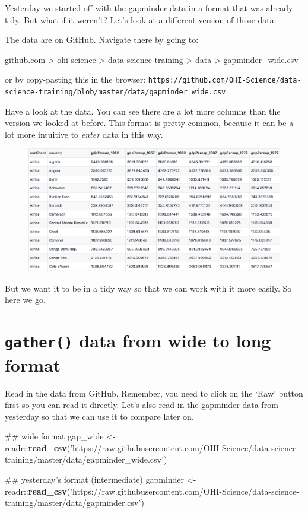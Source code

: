 \documentclass[]{book}
\newenvironment{Shaded}{\begin{snugshade}}{\end{snugshade}}
\newcommand{\KeywordTok}[1]{\textcolor[rgb]{0.13,0.29,0.53}{\textbf{{#1}}}}
\newcommand{\StringTok}[1]{\textcolor[rgb]{0.31,0.60,0.02}{{#1}}}
\newcommand{\NormalTok}[1]{{#1}}
\theoremstyle{definition}
\theoremstyle{definition}
\theoremstyle{definition}
\theoremstyle{remark}
\begin{document}
Yesterday we started off with the gapminder data in a format that was
already tidy. But what if it weren't? Let's look at a different version
of those data.

The data are on GitHub. Navigate there by going to:

github.com \textgreater{} ohi-science \textgreater{}
data-science-training \textgreater{} data \textgreater{}
gapminder\_wide.csv

or by copy-pasting this in the browser:
\texttt{https://github.com/OHI-Science/data-science-training/blob/master/data/gapminder\_wide.csv}

Have a look at the data. You can see there are a lot more columns than
the version we looked at before. This format is pretty common, because
it can be a lot more intuitive to \emph{enter} data in this way.

\begin{figure}[htbp]
\centering
\includegraphics{img/gapminder_wide_gh.png}
\caption{}
\end{figure}

But we want it to be in a tidy way so that we can work with it more
easily. So here we go.

\section{\texorpdfstring{\texttt{gather()} data from wide to long
format}{gather() data from wide to long format}}\label{gather-data-from-wide-to-long-format}

Read in the data from GitHub. Remember, you need to click on the `Raw'
button first so you can read it directly. Let's also read in the
gapminder data from yesterday so that we can use it to compare later on.

\begin{Shaded}
\begin{Highlighting}[]
\NormalTok{## wide format}
\NormalTok{gap_wide <-}\StringTok{ }\NormalTok{readr::}\KeywordTok{read_csv}\NormalTok{(}\StringTok{'https://raw.githubusercontent.com/OHI-Science/data-science-training/master/data/gapminder_wide.csv'}\NormalTok{)}

\NormalTok{## yesterday's format (intermediate)}
\NormalTok{gapminder <-}\StringTok{ }\NormalTok{readr::}\KeywordTok{read_csv}\NormalTok{(}\StringTok{'https://raw.githubusercontent.com/OHI-Science/data-science-training/master/data/gapminder.csv'}\NormalTok{)}
\end{Highlighting}
\end{Shaded}
\end{document}
